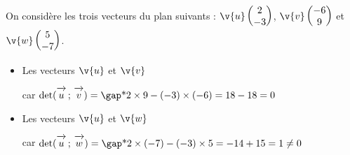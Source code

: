 \documentclass[10pt,a4paper,openany,twoside, prof]{book}
\begin{document}

\begin{ex}{}{}
	On considère les trois vecteurs du plan suivants : $\v{u}\coordvp{2}{-3}$, $\v{v}\coordvp{-6}{9}$ et $\v{w}\coordvp{5}{-7}$.
	\begin{itemize}
		\item  Les vecteurs $\v{u}$ et $\v{v}$ 

		car $\det{\vecu}{\vecv} = \troum{2\times9-(-3)\times(-6)=18-18=0}$
		\item  Les vecteurs $\v{u}$ et $\v{w}$ 

		car $\det{\vecu}{\vecw} = \troum{2\times(-7)-(-3)\times5=-14+15=1\neq0}$
	\end{itemize}
\end{ex}
\end{document}
